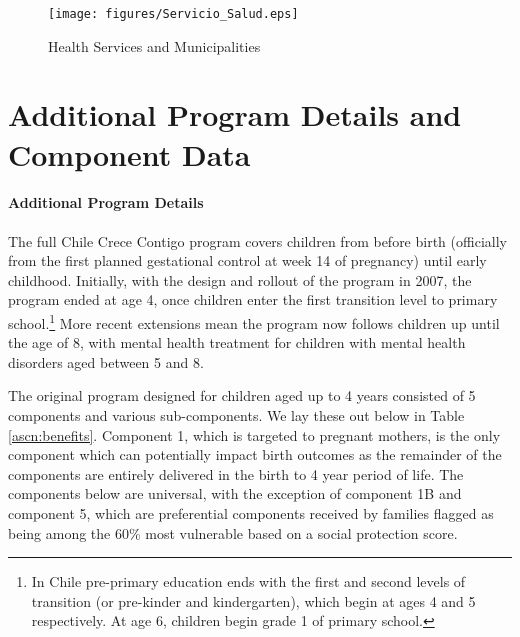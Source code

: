 \documentclass[12pt]{article}
\begin{document}
\begin{spacing}{1.4}
\begin{figure}[htpb!]
  \begin{center}
    \caption{Health Services and Municipalities}
    \label{fig:healthServices}
    \texttt{[image: figures/Servicio\_Salud.eps]}
  \end{center}
  \vspace{-6mm}
\end{figure}



\clearpage
\setcounter{table}{0}
\renewcommand{\thetable}{B\arabic{table}}
\setcounter{figure}{0}
\renewcommand{\thefigure}{B\arabic{figure}}
\section{Additional Program Details and Component Data}
\label{app:program}
\paragraph{Additional Program Details}
The full Chile Crece Contigo program covers children from before
birth (officially from the first planned gestational control
at week 14 of pregnancy) until early childhood.  Initially, with
the design and rollout of the program in 2007, the program
ended at age 4, once children enter the first transition level to
primary school.\footnote{In Chile pre-primary education ends with
  the first and second levels of transition (or pre-kinder and
  kindergarten), which begin at ages 4 and 5 respectively.  At age
  6, children begin grade 1 of primary school.}  More recent
extensions mean the program now follows children up until the
age of 8, with mental health treatment for children with mental
health disorders aged between 5 and 8.

The original program designed for children aged up to 4 years
consisted of 5 components and various sub-components.  We lay
these out below in Table \ref{ascn:benefits}.  Component
1, which is targeted to pregnant mothers, is the only component
which can potentially impact birth outcomes as the remainder of
the components are entirely delivered in the birth to 4 year
period of life.  The components below are universal, with the
exception of component 1B and component 5, which are preferential
components received by families flagged as being among the
60\% most vulnerable based on a social protection score.


\end{spacing}
\end{document}
